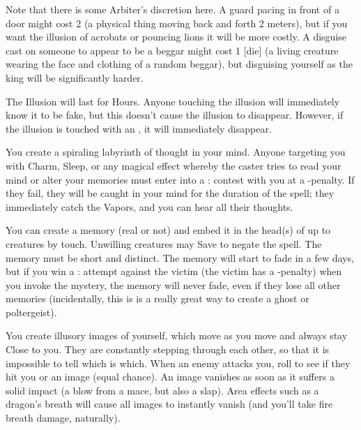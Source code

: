 {Note that there is some Arbiter's discretion here.  A guard pacing in front of a door might cost 2 \DICE (a physical thing moving back and forth 2
meters), but if you want the illusion of acrobats or pouncing lions it will be more costly.  A disguise cast on someone to appear to be a beggar might
cost 1 [die] (a living creature wearing the face and clothing of a random beggar), but disguising yourself as the king will be significantly harder.

The Illusion will last for \DICE Hours.  Anyone touching the illusion will immediately know it to be fake, but this doesn't cause the illusion to
disappear.  However, if the illusion is touched with an , it will immediately disappear.

\MYSTERY [
  Name = Labyrinth,
  Link = arcana-mystery-labyrinth,
  Paradigm = Mind,
  Save = N,
  Duration = Combat or \SUM Minutes,
  Target = Self
]

You create a spiraling labyrinth of thought in your mind.  Anyone targeting you with Charm, Sleep, or any magical effect whereby the caster tries to read your mind or alter your memories must enter into a \RB : \FOC contest with you at a -\DICE penalty.  If they fail, they will be caught in your mind for the duration of the spell;  they immediately catch the Vapors, and you can hear all their thoughts.

\MYSTERY [
  Name = Memory Lane,
  Link = arcana-mystery-memory-lane,
  Paradigm = Mind,
  Save = Y (neg.),
  Duration = Varies,
  Target = Close Target(s)
]

You can create a memory (real or not) and embed it in the head(s) of up to \DICE creatures by touch.  Unwilling creatures may Save to negate the spell.  The memory must be short and distinct.  The memory will start to fade in a few days, but if you win a \RB : \FOC attempt against the victim (the victim has a -\DICE penalty) when you invoke the mystery, the memory will never fade, even if they lose all other memories (incidentally, this is is a really great way to create a ghost or poltergeist).

\MYSTERY [
  Name = Mirror Image,
  Link = arcana-mystery-mirror-image,
  Paradigm = Mind,
  Save = n/a,
  Duration = Minutes,
  Target = Self
]

You create \DICE illusory images of yourself, which move as you move and always stay Close to you. They are constantly stepping through each other, so that it is impossible to tell which is which. When an enemy attacks you, roll to see if they hit you or an image (equal chance). An image vanishes as soon as it suffers a solid impact (a blow from a mace, but also a slap). Area effects such as a dragon's breath will cause all images to instantly vanish (and you'll take fire breath damage, naturally).

}
